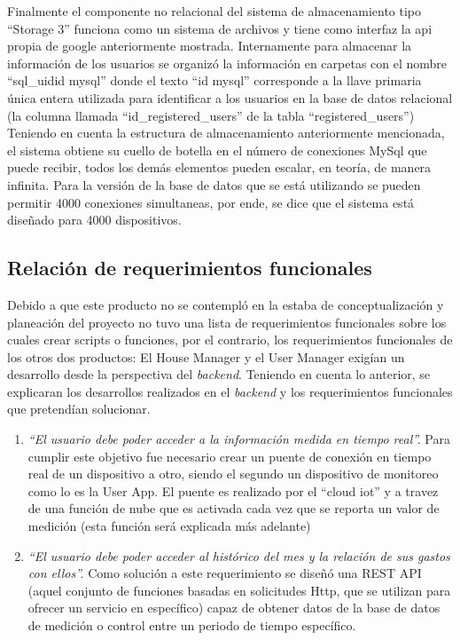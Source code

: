 Finalmente el componente no relacional del sistema de almacenamiento tipo ``Storage 3'' funciona como un sistema de archivos y tiene como interfaz la api propia de google anteriormente mostrada. Internamente para almacenar la información de los usuarios se organizó la información en carpetas con el nombre ``sql\_uid{id mysql}'' donde el texto ``{id mysql}'' corresponde a la llave primaria única entera utilizada para identificar a los usuarios en la base de datos relacional (la columna llamada ``id\_registered\_users'' de la tabla ``registered\_users'')
\vspace{0.5cm}\\
Teniendo en cuenta la estructura de almacenamiento anteriormente mencionada, el sistema obtiene su cuello de botella en el número de conexiones MySql que puede recibir, todos los demás elementos pueden escalar, en teoría, de manera infinita. Para la versión de la base de datos que se está utilizando se pueden permitir 4000 conexiones simultaneas, por ende, se dice que el sistema está diseñado para 4000 dispositivos.

\subsection{Relación de requerimientos funcionales}

Debido a que este producto no se contempló en la estaba de conceptualización y planeación del proyecto no tuvo una lista de requerimientos funcionales sobre los cuales crear scripts o funciones, por el contrario, los requerimientos funcionales de los otros dos productos: El House Manager y el User Manager exigían un desarrollo desde la perspectiva del \textit{backend}. Teniendo en cuenta lo anterior, se explicaran los desarrollos realizados en el \textit{backend} y los requerimientos funcionales que pretendían solucionar.

\begin{enumerate}
	\item \textsl{``El usuario debe poder acceder a la información medida en tiempo real''.} Para cumplir este objetivo fue necesario crear un puente de conexión en tiempo real de un dispositivo a otro, siendo el segundo un dispositivo de monitoreo como lo es la User App. El puente es realizado por el “cloud iot” y a travez de una función de nube que es activada cada vez que se reporta un valor de medición (esta función será explicada más adelante)
	\item \textsl{``El usuario debe poder acceder al histórico del mes y la relación de sus gastos con ellos''.} Como solución a este requerimiento se diseñó una REST API (aquel conjunto de funciones basadas en solicitudes Http, que se utilizan para ofrecer un servicio en específico) capaz de obtener datos de la base de datos de medición o control entre un periodo de tiempo específico. 
\end{enumerate}


